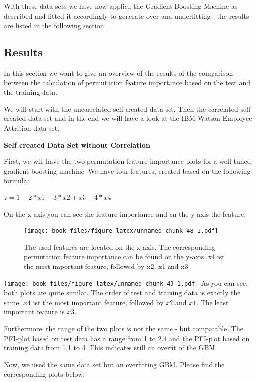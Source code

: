 \documentclass[
]{krantz}
\begin{document}
With these data sets we have now applied the Gradient Boosting Machine as described and fitted it accordingly to generate over and underfitting - the results are listed in the following section

\hypertarget{results}{%
\subsection{Results}\label{results}}

In this section we want to give an overview of the results of the comparison between the calculation of permutation feature importance based on the test and the training data.

We will start with the uncorrelated self created data set. Then the correlated self created data set and in the end we will have a look at the IBM Watson Employee Attrition data set.

\textbf{Self created Data Set without Correlation}

First, we will have the two permutation feature importance plots for a well tuned gradient boosting machine. We have four features, created based on the following formula:

\(z = 1 + 2*x1 + 3*x2 + x3 + 4*x4\)

On the x-axis you can see the feature importance and on the y-axis the feature.

\begin{figure}
\centering
\texttt{[image: book\_files/figure-latex/unnamed-chunk-48-1.pdf]}
\caption{\label{fig:unnamed-chunk-48}The used features are located on the x-axis. The corresponding permutation feature importance can be found on the y-axis. x4 ist the most important feature, followed by x2, x1 and x3}
\end{figure}

\texttt{[image: book\_files/figure-latex/unnamed-chunk-49-1.pdf]}
As you can see, both plots are quite similar. The order of test and training data is exactly the same. \(x4\) ist the most important feature, followed by \(x2\) and \(x1\). The least important feature is \(x3\).

Furthermore, the range of the two plots is not the same - but comparable. The PFI-plot based on test data has a range from 1 to 2.4 and the PFI-plot based on training data from 1.1 to 4. This indicates still an overfit of the GBM.

Now, we used the same data set but an overfitting GBM.
Please find the corresponding plots below:
\end{document}
